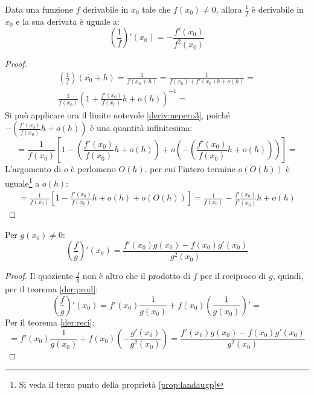 \begin{prop}
	\label{der:reci}
	Data una funzione $f$ derivabile in $x_0$ tale che $f(x_0)\neq0$, allora $\frac{1}{f}$ è derivabile in $x_0$ e la sua derivata è uguale a:
	\[
		\left(\frac{1}{f}\right)'(x_0)=-\frac{f'(x_0)}{f^2(x_0)}
	\]
\end{prop}
\begin{proof}
	\begin{gather*}
		\left(\frac{1}{f}\right)(x_0+h)=\frac{1}{f(x_0+h)}=\frac{1}{f(x_0)+f'(x_0)h+o(h)}=\\
		\frac{1}{f(x_0)}\left(1+\frac{f'(x_0)}{f(x_0)}h+o(h)\right)^{-1}=
	\end{gather*}
	Si può applicare ora il limite notevole \ref{deriv:nepero3}, poiché $-\left(\frac{f'(x_0)}{f(x_0)}h+o(h)\right)$ è una quantità infinitesima:
	\[
		=\frac{1}{f(x_0)}\left[1-\left(\frac{f'(x_0)}{f(x_0)}h+o(h)\right)+o\left(-\left(\frac{f'(x_0)}{f(x_0)}h+o(h)\right)\right)\right]=
	\]
	L'argomento di $o$ è perlomeno $O(h)$, per cui l'intero termine $o(O(h))$ è uguale\footnote{Si veda il terzo punto della proprietà \ref{prop:landaugp}} a $o(h)$:
	\begin{gather*}
		=\frac{1}{f(x_0)}\left[1-\frac{f'(x_0)}{f(x_0)}h+o(h)+o(O(h))\right]=\frac{1}{f(x_0)}-\frac{f'(x_0)}{f^2(x_0)}h+o(h)
	\end{gather*}
\end{proof}

\begin{prop}
	Per $g(x_0)\neq0$:
	\[
		\left(\frac{f}{g}\right)'(x_0)=\frac{f'(x_0)g(x_0)-f(x_0)g'(x_0)}{g^2(x_0)}
	\]
\end{prop}
\begin{proof}
	Il quoziente $\frac{f}{g}$ non è altro che il prodotto di $f$ per il reciproco di $g$, quindi, per il teorema \ref{der:prod}:
	\[
		\left(\frac{f}{g}\right)'(x_0)=f'(x_0)\frac{1}{g(x_0)}+f(x_0)\left(\frac{1}{g(x_0)}\right)'=
	\]
	Per il teorema \ref{der:reci}:
	\[
		=f'(x_0)\frac{1}{g(x_0)}+f(x_0)\left(-\frac{g'(x_0)}{g^2(x_0)}\right)=\frac{f'(x_0)g(x_0)-f(x_0)g'(x_0)}{g^2(x_0)}
	\]
\end{proof}

